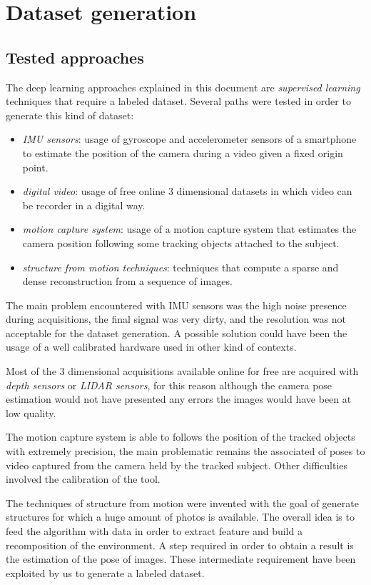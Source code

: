 \section{Dataset generation}
\subsection{Tested approaches}
The deep learning approaches explained in this document are \textit{supervised learning} techniques that require a labeled dataset. Several paths were tested in order to generate this kind of dataset:
\begin{itemize}
    \item \emph{IMU sensors}: usage of gyroscope and accelerometer sensors of a smartphone to estimate the position of the camera during a video given a fixed origin point. 
    \item \emph{digital video}: usage of free online 3 dimensional datasets in which video can be recorder in a digital way.
    \item \emph{motion capture system}: usage of a motion capture system that estimates the camera position following some tracking objects attached to the subject.
    \item \emph{structure from motion techniques}: techniques that compute a sparse and dense reconstruction from a sequence of images.
\end{itemize}

The main problem encountered with IMU sensors was the high noise presence during acquisitions, the final signal was very dirty, and the resolution was not acceptable for the dataset generation. A possible solution could have been the usage of a well calibrated hardware used in other kind of contexts.

Most of the 3 dimensional acquisitions available online for free are acquired with \emph{depth sensors} or \emph{LIDAR sensors}, for this reason although the camera pose estimation would not have presented any errors the images would have been at low quality.

The motion capture system is able to follows the position of the tracked objects with extremely precision, the main problematic remains the associated of poses to video captured from the camera held by the tracked subject. Other difficulties involved the calibration of the tool.

The techniques of structure from motion were invented with the goal of generate structures for which a huge amount of photos is available. The overall idea is to feed the algorithm with data in order to extract feature and build a recomposition of the environment. A step required in order to obtain a result is the estimation of the pose of images. These intermediate requirement have been exploited by us to generate a labeled dataset.

